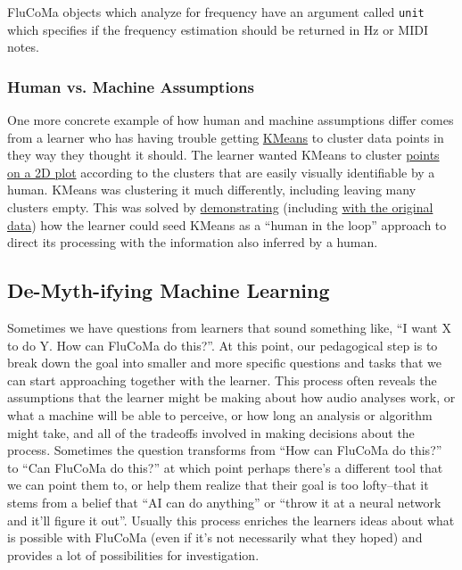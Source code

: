 \documentclass{article}
\begin{document}
FluCoMa objects which analyze for frequency have an argument called \texttt{unit} which specifies if the frequency estimation should be returned in Hz or MIDI notes.

\subsubsection{Human vs. Machine Assumptions}

One more concrete example of how human and machine assumptions differ
comes from a learner who has having trouble getting
\href{https://learn.flucoma.org/reference/kmeans/}{KMeans} to cluster
data points in they way they thought it should. The learner wanted
KMeans to cluster
\href{https://discourse.flucoma.org/uploads/default/original/2X/2/25c1edfb63797e7fd4051872088e6610ce908981.jpeg}{points on a 
2D plot} according to the clusters that are easily visually identifiable
by a human. KMeans was clustering it much differently,
including leaving many clusters empty. This was solved by
\href{https://www.youtube.com/watch?v=LzoWRqZzhZ4}{demonstrating}
(including \href{https://www.youtube.com/watch?v=mFsuJXqNYFs}{with the
original data}) how the learner could seed KMeans as a ``human in the
loop'' approach to direct its processing with the information also
inferred by a human.

\subsection{De-Myth-ifying Machine Learning}\label{de-myth-ifying-machine-learning}

Sometimes we have questions from learners that sound something like, ``I
want X to do Y. How can FluCoMa do this?''. At this point, our
pedagogical step is to break down the goal into smaller and more
specific questions and tasks that we can start approaching together with
the learner. This process often reveals the assumptions that the learner
might be making about how audio analyses work, or what a machine will be
able to perceive, or how long an analysis or algorithm might take, and
all of the tradeoffs involved in making decisions about the process.
Sometimes the question transforms from ``How can FluCoMa do this?'' to
``Can FluCoMa do this?'' at which point perhaps there's a different tool
that we can point them to, or help them realize that their goal is too
lofty--that it stems from a belief that ``AI can do anything'' or
``throw it at a neural network and it'll figure it out''. Usually this
process enriches the learners ideas about what is possible with FluCoMa
(even if it's not necessarily what they hoped) and provides a lot of
possibilities for investigation.
\end{document}
